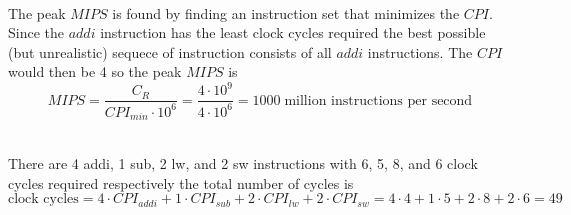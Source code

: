 \documentclass[11pt,reqno]{article}
\begin{document}
\noindent {}\\ 

The peak $MIPS$ is found by finding an instruction set that minimizes the $CPI$. Since the $addi$ instruction has the least clock cycles required the best possible (but unrealistic) sequece of instruction consists of all $addi$ instructions. The $CPI$ would then be 4 so the peak $MIPS$ is 
\begin{equation*}
MIPS = \frac{C_R}{CPI_{min} \cdot 10^6} = \frac{4 \cdot 10^9}{4 \cdot 10^6} =  1000 \; \text{million instructions per second}
\end{equation*}


\noindent {}\\ 

There are 4 addi, 1 sub, 2 lw, and 2 sw instructions with 6, 5, 8, and 6 clock cycles required respectively the total number of cycles is
\[ \text{clock cycles} = 4\cdot CPI_{addi} + 1\cdot CPI_{sub} +  2 \cdot CPI_{lw}  + 2 \cdot CPI_{sw} = 4\cdot 4 + 1 \cdot 5 + 2 \cdot 8 + 2 \cdot 6 = 49 \]
\end{document}
